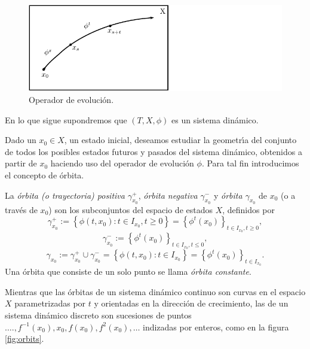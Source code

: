 \begin{figure}[!ht] \centering
    \includegraphics[scale=1.3]{figures/evolution-operator.pdf}
    \caption{Operador de evolución.}
	\label{fig:evolutionoperator}
\end{figure}

En lo que sigue supondremos que $( T, X, \phi )$ es un sistema
dinámico.

Dado un $x_0 \in X$, un estado inicial, deseamos estudiar la geometr\'{\i}a del
conjunto de todos los posibles estados futuros y pasados del sistema
din\'amico, obtenidos a partir de $x_0$ haciendo uso del operador de
evoluci\'on $\phi$.
Para tal fin introducimos el concepto de órbita.

\begin{definition}
  \label{def:orbit}La {\emph{\'orbita (o trayectoria) positiva
  $\gamma^+_{x_0}$}}, {\emph{\'orbita negativa $\gamma^-_{x_0}$}} y
  {\emph{\'orbita $\gamma_{x_0}$}} de $x_0$ (o a trav\'es de $x_0$) son
  los subconjuntos del espacio de estados $X$, definidos por
  \[ \gamma^+_{x_0} := \left\{ \phi \left( t, x_0 \right) : t \in I_{x_0},
     t \geq 0 \right\} = \left\{ \phi^t \left( x_0 \right) \right\}_{t
     \in I_{x_0}, t \geq 0}, \]
  \[ \gamma^-_{x_0} := \left\{ \phi^t \left( x_0 \right) \right\}_{t \in
     I_{x_0}, t \leq 0}, \]
  \[ \gamma_{x_0} := \gamma_{x_0}^+ \cup \gamma_{x_0}^- = \left\{ \phi
     \left( t, x_0 \right) : t \in I_{x_0} \right\} = \left\{ \phi^t \left( x_0
     \right) \right\}_{t \in I_{x_0}} . \]
  Una \'orbita que consiste de un solo punto se llama {\emph{\'orbita
  constante}}.
\end{definition}

Mientras que las \'orbitas de un sistema din\'amico continuo son curvas en el
espacio $X$ parametrizadas por $t$ y orientadas en la direcci\'on de
crecimiento, las de un sistema din\'amico discreto son sucesiones de puntos
$\ldots ., f^{- 1} \left( x_0 \right), x_0, f \left( x_0 \right), f^2 \left(
x_0 \right), \ldots$ indizadas por enteros, como en la figura \ref{fig:orbits}.

